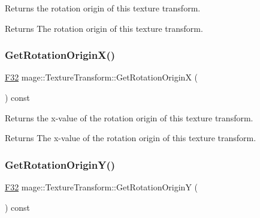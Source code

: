 Returns the rotation origin of this texture transform.

\begin{DoxyReturn}{Returns}
The rotation origin of this texture transform. 
\end{DoxyReturn}
\hypertarget{classmage_1_1_texture_transform_a8cf3f245042d98a135b5d12ae590b2b2}{}\label{classmage_1_1_texture_transform_a8cf3f245042d98a135b5d12ae590b2b2} 
\subsubsection{\texorpdfstring{Get\+Rotation\+Origin\+X()}{GetRotationOriginX()}}
{\footnotesize\ttfamily \hyperlink{namespacemage_aa97e833b45f06d60a0a9c4fc22ae02c0}{F32} mage\+::\+Texture\+Transform\+::\+Get\+Rotation\+OriginX (\begin{DoxyParamCaption}{ }\end{DoxyParamCaption}) const\hspace{0.3cm}{\ttfamily [noexcept]}}

Returns the x-\/value of the rotation origin of this texture transform.

\begin{DoxyReturn}{Returns}
The x-\/value of the rotation origin of this texture transform. 
\end{DoxyReturn}
\hypertarget{classmage_1_1_texture_transform_a2efe9088ae3532b188bab7c5b27238e6}{}\label{classmage_1_1_texture_transform_a2efe9088ae3532b188bab7c5b27238e6} 
\subsubsection{\texorpdfstring{Get\+Rotation\+Origin\+Y()}{GetRotationOriginY()}}
{\footnotesize\ttfamily \hyperlink{namespacemage_aa97e833b45f06d60a0a9c4fc22ae02c0}{F32} mage\+::\+Texture\+Transform\+::\+Get\+Rotation\+OriginY (\begin{DoxyParamCaption}{ }\end{DoxyParamCaption}) const\hspace{0.3cm}{\ttfamily [noexcept]}}

